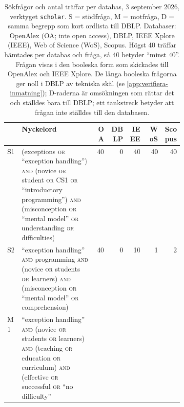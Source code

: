 \begin{table}[htbp]
  \centering
  \caption{Sökfrågor och antal träffar per databas, 3
    september 2026, verktyget \texttt{scholar}.  S = stödfråga,
    M = motfråga, D = samma begrepp som kort ordlista till DBLP.
    Databaser: OpenAlex (OA; inte \foreignlanguage{english}{open
    access}), DBLP, IEEE Xplore (IEEE), Web of Science (WoS), Scopus.
    Högst 40 träffar hämtades per databas och fråga, så 40 betyder
    \enquote{minst 40}.  Frågan visas i den booleska form som skickades
    till OpenAlex och IEEE Xplore.  De långa booleska frågorna ger noll
    i DBLP av tekniska skäl (se \cref{app:verifiera-inmatning}); D-raderna är
    omsökningen som rättar det och ställdes bara till DBLP; ett
    tankstreck betyder att frågan inte ställdes till den
    databasen.}
  \label{tab:nyb-queries}
  \footnotesize
  \begin{tabular}{@{}lp{0.42\linewidth}rrrrr@{}}
    \toprule
    & Nyckelord & OA & DBLP & IEEE & WoS & Scopus \\
    \midrule
    S1 & (exceptions \textsc{or} \enquote{exception handling})
      \textsc{and} (novice \textsc{or} student \textsc{or} CS1
      \textsc{or} \enquote{introductory programming}) \textsc{and}
      (misconception \textsc{or} \enquote{mental model} \textsc{or}
      understanding \textsc{or} difficulties)
      & 40 & 0 & 40 & 40 & 40 \\
    S2 & \enquote{exception handling} \textsc{and} programming
      \textsc{and} (novice \textsc{or} students \textsc{or} learners)
      \textsc{and} (misconception \textsc{or} \enquote{mental model}
      \textsc{or} comprehension)
      & 40 & 0 & 10 & 1 & 2 \\
    M1 & \enquote{exception handling} \textsc{and} (novice \textsc{or}
      students \textsc{or} learners) \textsc{and} (teaching \textsc{or}
      education \textsc{or} curriculum) \textsc{and} (effective
      \textsc{or} successful \textsc{or} \enquote{no difficulty}

\end{tabular}
\end{table}

